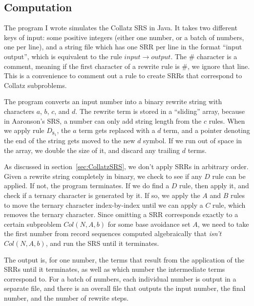 \subsection{Computation} \label{subsec:rewritecomp}
The program I wrote simulates the Collatz SRS in Java. It takes two different keys of input: some positive integers (either one number, or a batch of numbers, one per line), and a string file which has one SRR per line in the format ``input output'', which is equivalent to the rule $input \rightarrow output$. The \# character is a comment, meaning if the first character of a rewrite rule is \#, we ignore that line. This is a convenience to comment out a rule to create SRRs that correspond to Collatz subproblems. \par
The program converts an input number into a binary rewrite string with characters $a$, $b$, $c$, and $d$. The rewrite term is stored in a ``sliding'' array, because in Aaronson's SRS, a number can only add string length from the $c$ rules. When we apply rule $D_{8_1}$, the $a$ term gets replaced with a $d$ term, and a pointer denoting the end of the string gets moved to the new $d$ symbol. If we run out of space in the array, we double the size of it, and discard any trailing $d$ terms. \par
As discussed in section~\ref{sec:CollatzSRS}, we don't apply SRRs in arbitrary order. Given a rewrite string completely in binary, we check to see if any $D$ rule can be applied. If not, the program terminates. If we do find a $D$ rule, then apply it, and check if a ternary character is generated by it. If so, we apply the $A$ and $B$ rules to move the ternary character index-by-index until we can apply a $C$ rule, which removes the ternary character.
Since omitting a SRR corresponds exactly to a certain subproblem $Col(N,A,b)$ for some base avoidance set $A$, we need to take the first number from record sequences computed algebraically that \textit{isn't} $Col(N,A,b)$, and run the SRS until it terminates. \par
The output is, for one number, the terms that result from the application of the SRRs until it terminates, as well as which number the intermediate terms correspond to. For a batch of numbers, each individual number is output in a separate file, and there is an overall file that outputs the input number, the final number, and the number of rewrite steps.

